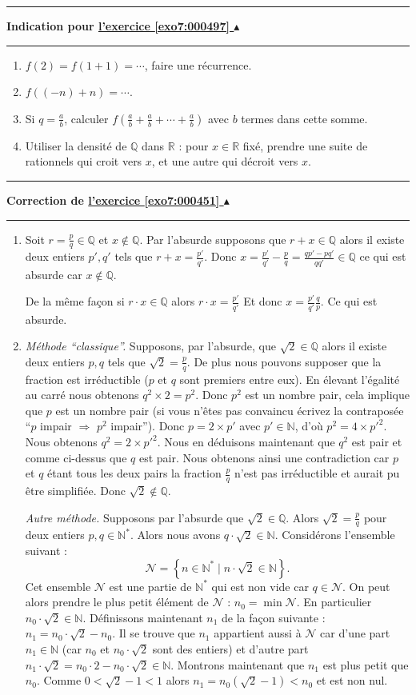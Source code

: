 \documentclass[11pt,a4paper]{article}
\newcommand{\Nn}{\mathbb{N}} \newcommand{\N}{\mathbb{N}}
\newcommand{\Qq}{\mathbb{Q}} \newcommand{\Q}{\mathbb{Q}}
\newcommand{\Rr}{\mathbb{R}} \newcommand{\R}{\mathbb{R}}
\newcounter{exo}
\newcommand{\indication}[1]{\hypertarget{ind7:#1}{}\label{ind7:#1}{\bf Indication pour \hyperlink{exo7:#1}{l'exercice \ref{exo7:#1} $\blacktriangle$}}\vspace{1mm}\hrule\vspace{1mm}}
\newcommand{\finindication}{\vspace{1mm}\hrule\vspace*{7mm}}
\newcommand{\correction}[1]{\hypertarget{cor7:#1}{}\label{cor7:#1}{\bf Correction de \hyperlink{exo7:#1}{l'exercice \ref{exo7:#1} $\blacktriangle$}}\vspace{1mm}\hrule\vspace{1mm}}
\begin{document}
\finindication
\indication{000497}
\begin{enumerate}
  \item $f(2)= f(1+1)= \cdots$, faire une r\'ecurrence.
  \item $f((-n)+n)=\cdots$.
  \item Si $q = \frac ab$, calculer $f(\frac ab + \frac ab + \cdots +\frac ab)$
avec $b$ termes dans cette somme.
  \item Utiliser la densit\'e
de $\Qq$ dans $\Rr$ : pour $x\in\Rr$ fix\'e, prendre une suite de rationnels qui croit vers $x$, et une autre qui d\'ecroit vers $x$.
\end{enumerate}
\finindication


\newpage

\correction{000451}
\begin{enumerate}
\item Soit $r=\frac pq\in \Qq$ et $x\notin\Qq$.
Par l'absurde supposons que $r+x\in \Qq$ alors il existe deux
entiers $p', q'$ tels que $r+x =\frac {p'}{q'}$. Donc $x = \frac
{p'}{q'}-\frac pq = \frac{qp'-pq'}{qq'}\in\Qq$ ce qui est absurde
car $x\notin \Qq$.

De la m\^eme fa\c{c}on  si $r \cdot x \in \Qq$ alors $r \cdot x = \frac{p'}{q'}$
Et donc $x = \frac {p'}{q'}\frac {q}{p}$. Ce qui est absurde.

\item \emph{Méthode ``classique''.} Supposons, par l'absurde, que $\sqrt2 \in \Qq$ alors il existe deux entiers $p,q$ tels que $\sqrt2=\frac pq$. De plus nous pouvons supposer que la fraction est irr\'eductible ($p$ et $q$ sont premiers entre eux). En \'elevant l'\'egalit\'e au carr\'e nous obtenons $q^2\times 2=p^2$. Donc $p^2$ est un nombre pair, cela implique que $p$ est un nombre pair (si vous n'\^etes pas convaincu \'ecrivez la contrapos\'ee ``$p$ impair $\Rightarrow$ $p^2$ impair''). Donc $p = 2\times p'$ avec $p'\in \Nn$, d'o\`u $p^2= 4\times {p'}^2$. Nous obtenons $q^2=2\times {p'}^2$. Nous en d\'eduisons maintenant que $q^2$ est pair et comme ci-dessus que $q$ est pair.
Nous obtenons ainsi une contradiction car  $p$ et $q$ \'etant tous
les deux pairs la fraction $\frac pq$ n'est pas irr\'eductible et
aurait pu \^etre simplifiée. Donc $\sqrt 2\notin\Qq$.

\emph{Autre méthode.} Supposons par l'absurde que $\sqrt 2 \in \Qq$. Alors $\sqrt 2 = \frac pq$ pour deux entiers $p,q \in \Nn^*$.
Alors nous avons $q \cdot \sqrt 2 \in \Nn$. Considérons l'ensemble suivant :
$$\mathcal{N} = \left\lbrace n \in \Nn^* \mid n\cdot \sqrt 2 \in \Nn \right\rbrace.$$
Cet ensemble $\mathcal{N}$ est une partie de $\Nn^*$ qui est non vide car $q\in\mathcal{N}$.
On peut alors prendre le plus petit élément de $\mathcal{N}$ : $n_0 = \min \mathcal{N}$.
En particulier $n_0 \cdot \sqrt 2 \in \Nn$.
Définissons maintenant $n_1$ de la façon suivante : $n_1 = n_0 \cdot \sqrt 2 - n_0$.
Il se trouve que $n_1$ appartient aussi à $\mathcal{N}$ car d'une part
 $n_1 \in \Nn$ (car $n_0$ et $n_0 \cdot \sqrt{2}$ sont des entiers) et d'autre part
$n_1 \cdot \sqrt 2 = n_0 \cdot 2 - n_0 \cdot \sqrt 2 \in \Nn$.
Montrons maintenant que $n_1$ est plus petit que $n_0$.
Comme $0 < \sqrt 2 -1 < 1$ alors $n_1 = n_0 (\sqrt 2 -1) < n_0$ et est non nul.


\end{enumerate}
\end{document}
